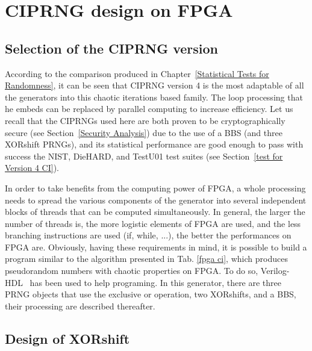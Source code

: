 \section{CIPRNG design on FPGA}
\label{FPGA design}
\subsection{Selection of the CIPRNG version}

According to the comparison produced in Chapter~\ref{Statistical Tests for Randomness}, 
it can be seen that CIPRNG version 4 is the most adaptable of all the generators into
this chaotic iterations based family. 
The loop processing that he embeds can be replaced by parallel computing to increase  efficiency. 
Let us recall that the CIPRNGs used here are both proven to be cryptographically secure (see Section~\ref{Security Analysis}) due to the use of a BBS (and three XORshift PRNGs), 
and its statistical performance are good enough to pass with success the NIST, DieHARD, and TestU01 test suites (see Section~\ref{test for Version 4 CI}).

In order to take benefits from the computing power of FPGA, a whole processing
needs to spread the various components of the generator 
into several independent blocks  of threads that can be computed
simultaneously. In general,  the larger the number of  threads is, the
more logistic elements of FPGA are used, and the less branching  instructions are
used  (if,  while,  ...),  the  better the  performances  on  FPGA  are.
Obviously, having these requirements in  mind, it is possible to build
a program similar to the algorithm presented in Tab.
\ref{fpga ci}, which produces pseudorandom numbers with chaotic properties on FPGA.  
To do so,  Verilog-HDL~\cite{verilog} has been used to help programing. 
In this generator, there are three
PRNG objects that use the exclusive or operation, two XORshifts, and a BBS, 
their processing are described thereafter.


\subsection{Design of XORshift}

